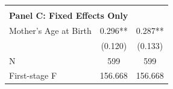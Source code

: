\begin{table}[ht!]
{\begin{tabular}{l*{2}{c}}
                    &               &               \\
\hline \\ \multicolumn{3}{l}{\textbf{Panel C: Fixed Effects Only}} \\
Mother's Age at Birth&       0.296** &       0.287** \\
                    &     (0.120)   &     (0.133)   \\
\midrule
N                   &         599   &         599   \\
First-stage F       &     156.668   &     156.668   \\
\bottomrule \end{tabular}}\end{table}
